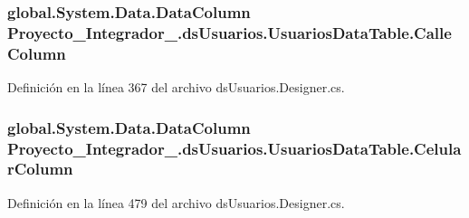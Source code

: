 \hypertarget{class_proyecto___integrador__3_1_1ds_usuarios_1_1_usuarios_data_table_acbf55d075ab35bd85f1efb354bb744b4}{
\subsubsection[{Calle\-Column}]{\setlength{\rightskip}{0pt plus 5cm}global.\-System.\-Data.\-Data\-Column Proyecto\-\_\-\-Integrador\-\_.\-ds\-Usuarios.\-Usuarios\-Data\-Table.\-Calle\-Column\hspace{0.3cm}{\ttfamily [get]}}}\label{class_proyecto___integrador__3_1_1ds_usuarios_1_1_usuarios_data_table_acbf55d075ab35bd85f1efb354bb744b4}


Definición en la línea 367 del archivo ds\-Usuarios.\-Designer.\-cs.

\hypertarget{class_proyecto___integrador__3_1_1ds_usuarios_1_1_usuarios_data_table_ab00350fd3b8bd2f7f26fdd22da40cf47}{
\subsubsection[{Celular\-Column}]{\setlength{\rightskip}{0pt plus 5cm}global.\-System.\-Data.\-Data\-Column Proyecto\-\_\-\-Integrador\-\_.\-ds\-Usuarios.\-Usuarios\-Data\-Table.\-Celular\-Column\hspace{0.3cm}{\ttfamily [get]}}}\label{class_proyecto___integrador__3_1_1ds_usuarios_1_1_usuarios_data_table_ab00350fd3b8bd2f7f26fdd22da40cf47}


Definición en la línea 479 del archivo ds\-Usuarios.\-Designer.\-cs.

